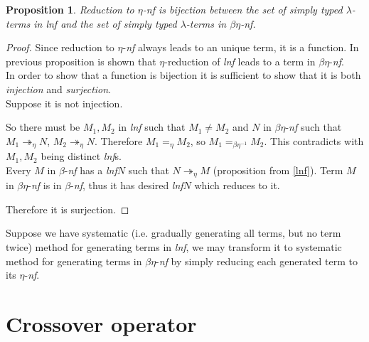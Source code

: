 \documentclass{sig-alternate}
\newtheorem{proposition}{Proposition}
\newcommand{\lterms}{$\lambda$-terms\xspace}
\newcommand{\etar}{\twoheadrightarrow_\eta}
\newcommand{\ered}{$\eta$-reduction\xspace}
\newcommand{\bnf}{$\beta$-\textit{nf}\xspace}
\newcommand{\enf}{$\eta$-\textit{nf}\xspace}
\newcommand{\benf}{$\beta\eta$-\textit{nf}\xspace}
\newcommand{\lnf}{\textit{lnf}\xspace}
\begin{document}
\begin{proposition}

Reduction to \enf is bijection between  
the set of simply typed \lterms in \lnf and 
the set of simply typed \lterms in \benf.
\end{proposition}
\begin{proof}

Since reduction to \enf always leads to an unique term, it is a function.
In previous proposition is shown that \ered of \lnf
leads to a term in \benf.\\

In order to show that a function is bijection it is sufficient to show that it is
both \textit{injection} and \textit{surjection}.\\

Suppose it is not injection.

So there must be $M_1,M_2$ in \lnf such that $M_1 \not= M_2$
and $N$ in \benf such that $M_1 \etar N$, $M_2 \etar N$.
Therefore $M_1 =_\eta M_2$, 
so $M_1 =_{\beta\eta^{-1}} M_2$.
This contradicts with $M_1,M_2$ being distinct \lnf{}s.\\

Every $M$ in \bnf has a \lnf $N$ such that 
$N \twoheadrightarrow_{\eta} M$ (proposition from \ref{lnf}).
Term $M$ in \benf is in \bnf, thus it has desired \lnf $N$
which reduces to it. 

Therefore it is surjection. 
\end{proof}

Suppose we have systematic (i.e. gradually generating all terms, 
but no term twice) method for generating terms in \lnf,
we may transform it to systematic method for generating terms in \benf
by simply reducing each generated term to its \enf.  


\section{Crossover operator}
\end{document}
